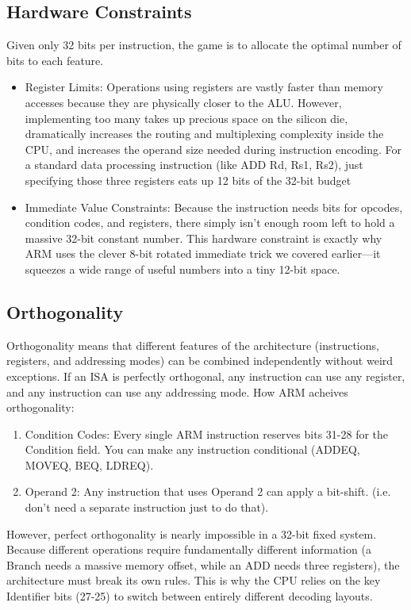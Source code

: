 \documentclass[../comorg-part1.tex]{subfiles}
\begin{document}
\subsection{Hardware Constraints}
Given only 32 bits per instruction, the game is to allocate the optimal number of bits to each feature.
\begin{itemize}
    \item Register Limits: Operations using registers are vastly faster than memory accesses because they are physically closer to the ALU.
    However, implementing too many takes up precious space on the silicon die, dramatically increases the routing and multiplexing complexity inside the CPU, and increases the operand size needed during instruction encoding.
    For a standard data processing instruction (like ADD Rd, Rs1, Rs2), just specifying those three registers eats up 12 bits of the 32-bit budget
    \item Immediate Value Constraints: Because the instruction needs bits for opcodes, condition codes, and registers, there simply isn't enough room left to hold a massive 32-bit constant number.
    This hardware constraint is exactly why ARM uses the clever 8-bit rotated immediate trick we covered earlier—it squeezes a wide range of useful numbers into a tiny 12-bit space.
\end{itemize}

\subsection{Orthogonality}
Orthogonality means that different features of the architecture (instructions, registers, and addressing modes) can be combined independently without weird exceptions.\newline
If an ISA is perfectly orthogonal, any instruction can use any register, and any instruction can use any addressing mode.\newline
How ARM acheives orthogonality:
\begin{enumerate}
    \item Condition Codes: Every single ARM instruction reserves bits 31-28 for the Condition field. You can make any instruction conditional (ADDEQ, MOVEQ, BEQ, LDREQ).
    \item Operand 2: Any instruction that uses Operand 2 can apply a bit-shift. (i.e. don't need a separate instruction just to do that).
\end{enumerate}
However, perfect orthogonality is nearly impossible in a 32-bit fixed system.
Because different operations require fundamentally different information (a Branch needs a massive memory offset, while an ADD needs three registers), the architecture must break its own rules. This is why the CPU relies on the key Identifier bits (27-25) to switch between entirely different decoding layouts.

 
\end{document}
